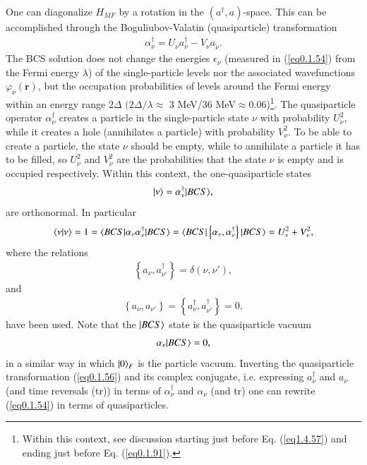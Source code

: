 One can diagonalize $H_{MF}$ by a rotation in the $(a^\dagger,a)$-space. This can be accomplished through the Boguliubov-Valatin (quasiparticle) transformation
\begin{align}\label{eq0.1.56}
\alpha^\dagger_\nu=U_\nu a^\dagger_\nu-V_\nu a_{\tilde\nu}.
\end{align}
The BCS solution does not change the energies $\epsilon_\nu$ (measured in (\ref{eq0.1.54}) from the Fermi energy $\lambda$) of the single-particle levels nor the associated wavefunctions $\varphi_{\nu}(\mathbf r)$, but the occupation probabilities of levels around the Fermi energy within an energy range $2\Delta$ $(2\Delta/\lambda\approx$ 3 MeV/36 MeV$\approx0.06$)\footnote{Within this context, see discussion starting just before Eq. (\ref{eq1.4.57}) and ending just before Eq. (\ref{eq0.1.91}).}. The quasiparticle operator $\alpha^\dagger_\nu$ creates a particle in the single-particle state $\nu$ with probability $U^2_\nu$, while it creates a hole (annihilates a particle) with probability $V^2_\nu$. To be able to create a particle, the state $\nu$ should be empty, while to annihilate a particle it has to be filled, so $U^2_\nu$ and $V^2_\nu$ are the probabilities  that the state $\nu$ is empty and is occupied respectively. Within this context, the one-quasiparticle states   
\begin{align}\label{eq0.1.57}
|{\nu} \rangle=\alpha^\dagger_\nu|{BCS} \rangle,
\end{align}
are orthonormal. In particular
\begin{align}\label{eq0.1.58}
\langle {\nu|\nu} \rangle=1=\langle {BCS|\alpha_{\nu}\alpha^\dagger_\nu|BCS} \rangle=\langle {BCS|\left\{\alpha_{\nu},\alpha^\dagger_\nu\right\}|BCS} \rangle=U^2_\nu+V^2_\nu,
\end{align}
where the relations
\begin{align}\label{eq0.1.59}
\left\{a_{\nu},a^\dagger_{\nu'}\right\}=\delta(\nu,\nu'),
\end{align}
and
\begin{align}\label{eq0.1.60}
\left\{a_{\nu},a_{\nu'}\right\}=\left\{a^\dagger_{\nu},a^\dagger_{\nu'}\right\}=0,
\end{align}
have been used. Note that the $|{BCS} \rangle$ state is the quasiparticle vacuum
\begin{align}\label{eq0.1.61}
\alpha_\nu|{BCS} \rangle=0,
\end{align}
in a similar way in which $|{0} \rangle_F$ is the particle vacuum. Inverting the quasiparticle transformation (\ref{eq0.1.56}) and its complex conjugate, i.e. expressing $a_\nu^\dagger$ and $a_\nu$ (and time reversals (tr)) in terms of $\alpha^\dagger_\nu$ and $\alpha_\nu$ (and tr) one can rewrite (\ref{eq0.1.54}) in terms of quasiparticles.

